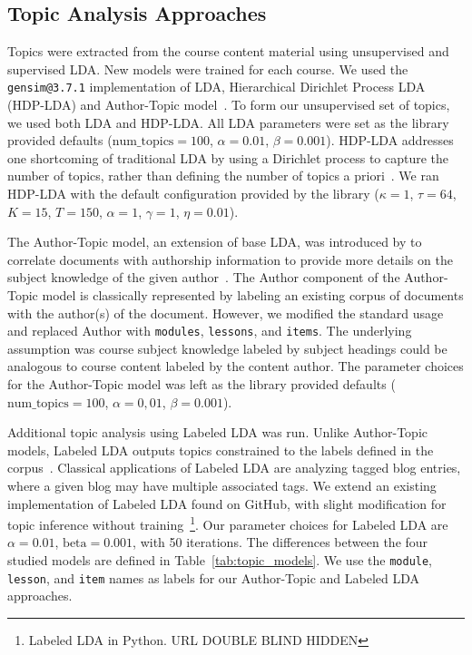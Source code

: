 \documentclass[sigconf, anonymous]{acmart}
\begin{document}
\subsection{Topic Analysis Approaches}
Topics were extracted from the course content material using unsupervised and supervised LDA.
New models were trained for each course.
We used the \texttt{gensim@3.7.1} implementation of LDA, Hierarchical Dirichlet Process LDA (HDP-LDA) and Author-Topic model~\cite{rehurek_lrec}.
To form our unsupervised set of topics, we used both LDA and HDP-LDA.
All LDA parameters were set as the library provided defaults ($\text{num\_topics}=100$, $\alpha=0.01$, $\beta=0.001$).
HDP-LDA addresses one shortcoming of traditional LDA by using a Dirichlet process to capture the number of topics, rather than defining the number of topics a priori~\cite{wang2011online}.
We ran HDP-LDA with the default configuration provided by the library ($\kappa=1$, $\tau=64$, $K=15$, $T=150$, $\alpha=1$, $\gamma=1$, $\eta=0.01$).

The Author-Topic model, an extension of base LDA, was introduced by \citeauthor{rosen2004author} to correlate documents with authorship information to provide more details on the subject knowledge of the given author~\cite{rosen2004author}.
The Author component of the Author-Topic model is classically represented by labeling an existing corpus of documents with the author(s) of the document.
However, we modified the standard usage and replaced Author with \texttt{modules}, \texttt{lessons}, and \texttt{items}.
The underlying assumption was course subject knowledge labeled by subject headings could be analogous to course content labeled by the content author.
The parameter choices for the Author-Topic model was left as the library provided defaults ($\text{num\_topics}=100$, $\alpha=0,01$, $\beta=0.001$).

Additional topic analysis using Labeled LDA was run.
Unlike Author-Topic models, Labeled LDA outputs topics constrained to the labels defined in the corpus~\cite{ramage2009labeled}.
Classical applications of Labeled LDA are analyzing tagged blog entries, where a given blog may have multiple associated tags.
We extend an existing implementation of Labeled LDA found on GitHub, with slight modification for topic inference without training~\footnote{Labeled LDA in Python.
    URL DOUBLE BLIND HIDDEN}.
Our parameter choices for Labeled LDA are $\alpha=0.01$, $\text{beta}=0.001$, with 50 iterations.
The differences between the four studied models are defined in Table~\ref{tab:topic_models}. We use the \texttt{module}, \texttt{lesson}, and \texttt{item} names as labels for our Author-Topic and Labeled LDA approaches.
\end{document}
